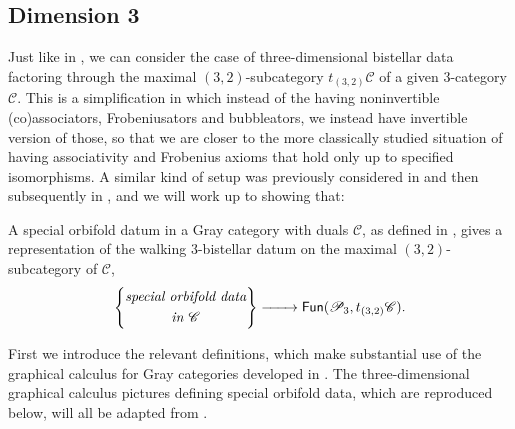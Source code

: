 \documentclass[12pt,a4paper]{article}
\numberwithin{equation}{section}
\begin{document}
\subsection{Dimension 3}\label{ssec:special_orbifold_data}

Just like in , we can consider the case of three-dimensional bistellar data factoring through the maximal $(3,2)$-subcategory $t_{(3,2)} \mathscr{C}$ of a given 3-category $\mathscr{C}$. This is a simplification in which instead of the having noninvertible (co)associators, Frobeniusators and bubbleators, we instead have invertible version of those, so that we are closer to the more classically studied situation of having associativity and Frobenius axioms that hold only up to specified isomorphisms. A similar kind of setup was previously considered in \cite{orbifoldnd} and then subsequently in \cite{orbifold3d}, and we will work up to showing that:
%
\begin{proposition}\label{prop:3_bistellar_from_special_orbifold}
    A special orbifold datum in a Gray category with duals $\mathscr{C}$, as defined in \cite[Def.\,4.1]{orbifold3d}, gives a representation of the walking 3-bistellar datum on the maximal $(3,2)$-subcategory of $\mathscr{C}$,
    \begin{equation}
        \left\{ \begin{gathered}
        \emph{\text{special orbifold data}} \\ \emph{\text{in }} \mathscr{C}
    \end{gathered} \right\} \xrightarrow{\qquad} \mathsf{Fun}(\mathscr{P}_3, t_{(3,2)} \mathscr{C}).
    \end{equation}
\end{proposition}

First we introduce the relevant definitions, which make substantial use of the graphical calculus for Gray categories developed in \cite{graphicalcalculus}. The three-dimensional graphical calculus pictures defining special orbifold data, which are reproduced below, will all be adapted from \cite{orbifold3d}.
\end{document}
